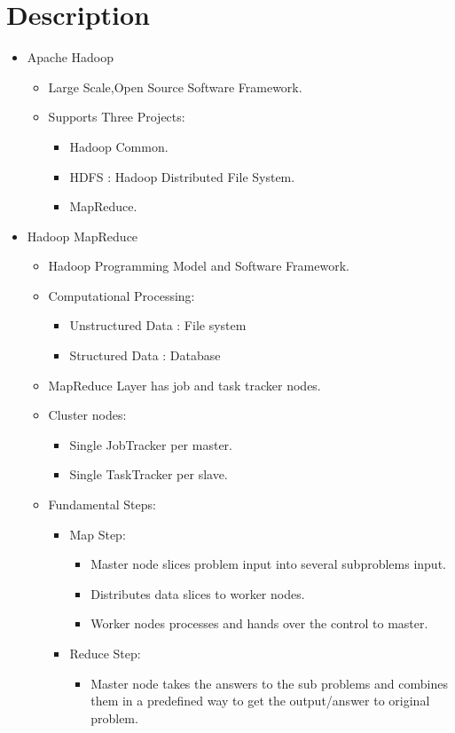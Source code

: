 \documentclass[a4paper,10pt]{article}
\begin{document}
\section{Description}
\begin{itemize}
	\item Apache Hadoop
	\begin{itemize}
		\item Large Scale,Open Source Software Framework.
		\item Supports Three Projects:
		\begin{itemize}
			\item Hadoop Common.
			\item HDFS : Hadoop Distributed File System.
			\item MapReduce.
		\end{itemize}
	\end{itemize}
   \item Hadoop MapReduce
     \begin{itemize}
     	\item Hadoop Programming Model and Software Framework.
     	\item Computational Processing:
     	\begin{itemize}
     		\item Unstructured Data : File system
     		\item Structured Data : Database	
     	\end{itemize}
        \item MapReduce Layer has job and task tracker nodes.
        \item Cluster nodes: 
        \begin{itemize}
        	\item Single JobTracker per master.
        	\item Single TaskTracker per slave.
        \end{itemize}
        \item Fundamental Steps:
        \begin{itemize}
        	\item Map Step:
        	\begin{itemize}
        		\item Master node slices problem input into several subproblems input.
        		\item Distributes data slices to worker nodes.
        		\item Worker nodes processes and hands over the control to master.
        	\end{itemize}
           \item Reduce Step: 
           \begin{itemize}
           	\item Master node takes the answers to the sub problems and combines them in a predefined way to get the output/answer to original problem. 
           \end{itemize}
           \end{itemize}
\end{itemize}
\end{itemize}
\end{document}
